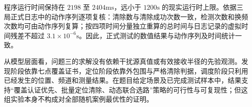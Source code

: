 程序运行时间保持在 $2198$ 至 $2404\mathrm{ms}$，远小于 $1200\mathrm{s}$ 的现实运行时上限。依据三局正式日志中的动作序列逐项复核：清除数与清除成功次数一致，检测次数和换频次数均可由动作序列复算；按四项时间分量独立重算的总时间与日志记录的虚拟时间残差不超过 $3.1\times10^{-6}\mathrm{s}$。因此，正式测试的数值结果与动作序列及时间统计一致。

从模型层面看，问题三的求解没有依赖干扰源真值或有效接收半径的先验观测。发现阶段依靠七点覆盖证书，定位阶段依靠外包围与严格清除判据，调度阶段只利用已经发生的位置、频道和测量结果。在题目给定场景及已完成测试样本中，结果支持“覆盖认证优先、批量定位清除、动态联合选路”策略的可行性与可复现性；但这组实验本身不构成对全部随机案例最优性的证明。
